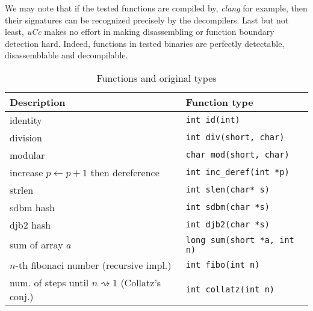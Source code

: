 \documentclass[a4paper]{llncs}
\begin{document}
We may note that if the tested functions are
compiled by, \emph{clang} for example, then their signatures can be recognized precisely
by the decompilers. Last but not least, \emph{uCc} makes no effort in making disassembling or function
boundary detection hard. Indeed, functions in tested binaries are perfectly detectable,
disassemblable and decompilable.

\begin{table}
	\begin{center}
		\caption{Functions and original types}\label{description}
		\begin{tabular}{|l|l|}
			\hline
			Description & Function type \\
			\hline
			identity & \texttt{int id(int)} \\
			\hline
			division & \texttt{int div(short, char)} \\
			\hline
			modular & \texttt{char mod(short, char)} \\
			\hline
			increase $p \leftarrow p + 1$ then dereference & \texttt{int inc\_deref(int *p)} \\
			\hline
			strlen  & \texttt{int slen(char* s)} \\
			\hline
			sdbm hash & \texttt{int sdbm(char *s)} \\
			\hline
			djb2 hash & \texttt{int djb2(char *s)} \\
			\hline
			sum of array $a$ & \texttt{long sum(short *a, int n)} \\
			\hline
			$n$-th fibonaci number (recursive impl.) & \texttt{int fibo(int n)} \\
			\hline
			num. of steps until $n \rightsquigarrow 1$ (Collatz's conj.)  & \texttt{int collatz(int n)} \\
			\hline
		\end{tabular}
	\end{center}
\end{table}
\end{document}
